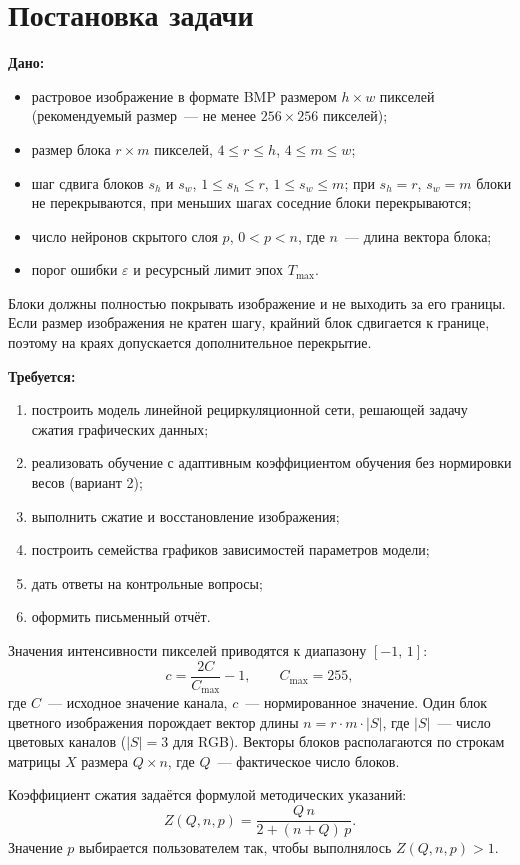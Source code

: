 \section{Постановка задачи}
\label{sec:task}

\textbf{Дано:}
\begin{itemize}
	\item растровое изображение в формате BMP размером $h \times w$ пикселей (рекомендуемый размер~--- не менее $256 \times 256$ пикселей);
	\item размер блока $r \times m$ пикселей, $4 \le r \le h$, $4 \le m \le w$;
	\item шаг сдвига блоков $s_h$ и $s_w$, $1 \le s_h \le r$, $1 \le s_w \le m$; при $s_h=r$, $s_w=m$ блоки не перекрываются, при меньших шагах соседние блоки перекрываются;
	\item число нейронов скрытого слоя $p$, $0 < p < n$, где $n$~--- длина вектора блока;
	\item порог ошибки $\varepsilon$ и ресурсный лимит эпох $T_{\max}$.
\end{itemize}

Блоки должны полностью покрывать изображение и не выходить за его границы. Если размер изображения не кратен шагу, крайний блок сдвигается к границе, поэтому на краях допускается дополнительное перекрытие.

\textbf{Требуется:}
\begin{enumerate}
	\item построить модель линейной рециркуляционной сети, решающей задачу сжатия графических данных;
	\item реализовать обучение с адаптивным коэффициентом обучения без нормировки весов (вариант 2);
	\item выполнить сжатие и восстановление изображения;
	\item построить семейства графиков зависимостей параметров модели;
	\item дать ответы на контрольные вопросы;
	\item оформить письменный отчёт.
\end{enumerate}

Значения интенсивности пикселей приводятся к диапазону $[-1,\,1]$:
\begin{equation}
	c = \frac{2C}{C_{\max}} - 1, \qquad C_{\max}=255,
	\label{eq:norm}
\end{equation}
где $C$~--- исходное значение канала, $c$~--- нормированное значение. Один блок цветного изображения порождает вектор длины $n = r \cdot m \cdot |S|$, где $|S|$~--- число цветовых каналов ($|S|=3$ для RGB). Векторы блоков располагаются по строкам матрицы $X$ размера $Q \times n$, где $Q$~--- фактическое число блоков.

Коэффициент сжатия задаётся формулой методических указаний:
\begin{equation}
	Z(Q,n,p) = \frac{Q\,n}{2 + (n+Q)\,p}.
	\label{eq:Z}
\end{equation}
Значение $p$ выбирается пользователем так, чтобы выполнялось $Z(Q,n,p) > 1$.
